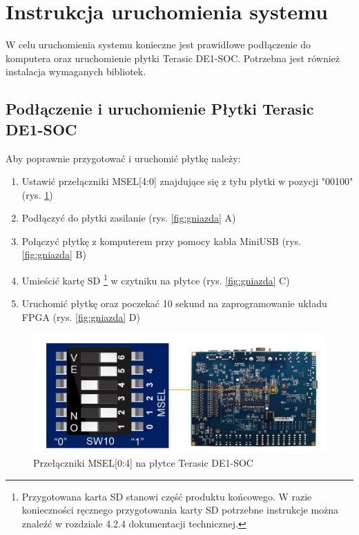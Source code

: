 \section{Instrukcja uruchomienia systemu}
W celu uruchomienia systemu konieczne jest prawidłowe podłączenie do komputera oraz uruchomienie płytki Terasic DE1-SOC. Potrzebna jest również instalacja wymaganych bibliotek.

\subsection{Podłączenie i uruchomienie Płytki Terasic DE1-SOC}
Aby poprawnie przygotować i uruchomić płytkę należy:
\begin{enumerate}
\item Ustawić przełączniki MSEL[4:0] znajdujące się z tyłu płytki w pozycji "00100"  (rys. \ref{fig:msel})
\item Podłączyć do płytki zasilanie (rys. \ref{fig:gniazda} A)
\item Połączyć płytkę z komputerem przy pomocy kabla MiniUSB (rys. \ref{fig:gniazda} B)
\item Umieścić kartę SD \footnote{Przygotowana karta SD stanowi część produktu końcowego. W razie konieczności ręcznego przygotowania karty SD potrzebne instrukcje można znaleźć w rozdziale 4.2.4 dokumentacji technicznej.} w czytniku na płytce (rys. \ref{fig:gniazda} C)
\item Uruchomić płytkę oraz poczekać 10 sekund na zaprogramowanie układu FPGA (rys. \ref{fig:gniazda} D)
\end{enumerate}

\begin{figure}[!p]
\centering
\includegraphics[width=\textwidth]{pictures/msel.png}
\caption{Przełączniki MSEL[0:4] na płytce Terasic DE1-SOC}
\label{fig:msel}
\end{figure}

